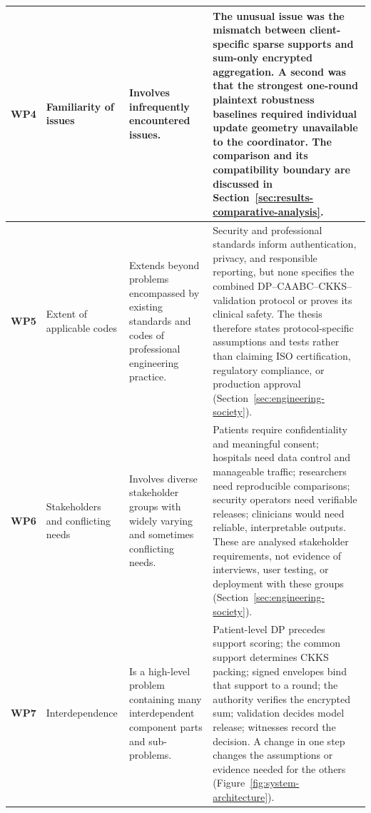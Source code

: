 \begin{longtable}{|p{0.9cm}|p{2.8cm}|p{3.8cm}|p{5.2cm}|}
\textbf{WP4} &
Familiarity of issues &
Involves infrequently encountered issues. &
The unusual issue was the mismatch between client-specific sparse supports and sum-only encrypted aggregation. A second was that the strongest one-round plaintext robustness baselines required individual update geometry unavailable to the coordinator. The comparison and its compatibility boundary are discussed in Section~\ref{sec:results-comparative-analysis}.\\
\hline

\textbf{WP5} &
Extent of applicable codes &
Extends beyond problems encompassed by existing standards and codes of professional engineering practice. &
Security and professional standards inform authentication, privacy, and responsible reporting, but none specifies the combined DP--CAABC--CKKS--validation protocol or proves its clinical safety. The thesis therefore states protocol-specific assumptions and tests rather than claiming ISO certification, regulatory compliance, or production approval (Section~\ref{sec:engineering-society}).\\
\hline

\textbf{WP6} &
Stakeholders and conflicting needs &
Involves diverse stakeholder groups with widely varying and sometimes conflicting needs. &
Patients require confidentiality and meaningful consent; hospitals need data control and manageable traffic; researchers need reproducible comparisons; security operators need verifiable releases; clinicians would need reliable, interpretable outputs. These are analysed stakeholder requirements, not evidence of interviews, user testing, or deployment with these groups (Section~\ref{sec:engineering-society}).\\
\hline

\textbf{WP7} &
Interdependence &
Is a high-level problem containing many interdependent component parts and sub-problems. &
Patient-level DP precedes support scoring; the common support determines CKKS packing; signed envelopes bind that support to a round; the authority verifies the encrypted sum; validation decides model release; witnesses record the decision. A change in one step changes the assumptions or evidence needed for the others (Figure~\ref{fig:system-architecture}).\\
\hline
\end{longtable}

\clearpage

